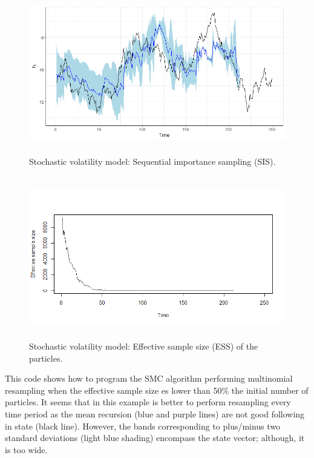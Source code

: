 \begin{enumerate}[leftmargin=*]
\begin{figure}[!h]
	\includegraphics[width=340pt, height=200pt]{Chapters/chapter8/figures/SIS.png}
	\caption[List of figure caption goes here]{Stochastic volatility model: Sequential importance sampling (SIS).}\label{figSIS}
\end{figure}

\begin{figure}[!h]
	\includegraphics[width=340pt, height=200pt]{Chapters/chapter8/figures/ESSsis.png}
	\caption[List of figure caption goes here]{Stochastic volatility model: Effective sample size (ESS) of the particles.}\label{figESS}
\end{figure} 

This code shows how to program the SMC algorithm performing multinomial resampling when the effective sample size es lower than 50\% the initial number of particles. It seems that in this example is better to perform resampling every time period as the mean recursion (blue and purple lines) are not good following in state (black line). However, the bands corresponding to plus/minus two standard deviations (light blue shading) encompass the state vector; although, it is too wide.


\end{enumerate}
